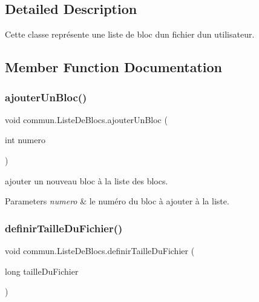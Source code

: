 \subsection{Detailed Description}
Cette classe représente une liste de bloc d\textquotesingle{}un fichier d\textquotesingle{}un utilisateur. 

\subsection{Member Function Documentation}
\mbox{\label{classcommun_1_1ListeDeBlocs_a76b292081d24cfdffb66961056e0dab8}} 
\subsubsection{\texorpdfstring{ajouter\+Un\+Bloc()}{ajouterUnBloc()}}
{\footnotesize\ttfamily void commun.\+Liste\+De\+Blocs.\+ajouter\+Un\+Bloc (\begin{DoxyParamCaption}\item[{int}]{numero }\end{DoxyParamCaption})\hspace{0.3cm}{\ttfamily [inline]}}



ajouter un nouveau bloc à la liste des blocs. 


\begin{DoxyParams}{Parameters}
{\em numero} & le numéro du bloc à ajouter à la liste. \\
\hline
\end{DoxyParams}
\mbox{\label{classcommun_1_1ListeDeBlocs_a31c5d230f4b27f5c94ede5c4104eea1c}} 
\subsubsection{\texorpdfstring{definir\+Taille\+Du\+Fichier()}{definirTailleDuFichier()}}
{\footnotesize\ttfamily void commun.\+Liste\+De\+Blocs.\+definir\+Taille\+Du\+Fichier (\begin{DoxyParamCaption}\item[{long}]{taille\+Du\+Fichier }\end{DoxyParamCaption})\hspace{0.3cm}{\ttfamily [inline]}}



